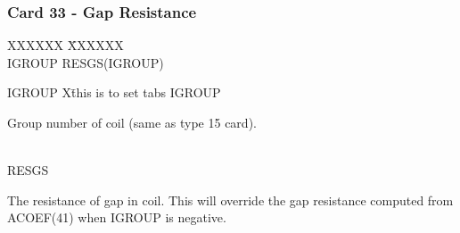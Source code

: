 \subsubsection{Card 33 - Gap Resistance}
\begin{tabbing}
XXXXXX \= XXXXXX   \\
\footnotesize IGROUP \>\footnotesize RESGS(IGROUP)
\end{tabbing}
\begin{tabbing}
IGROUP X\= this is to set tabs \kill
IGROUP \> \parbox[t]{\width}{Group number of coil (same as type 15 card).}\\
RESGS \> \parbox[t]{\width}{The resistance of gap in coil.  This will override the gap resistance
computed from ACOEF(41) when IGROUP is negative.}
\end{tabbing}


